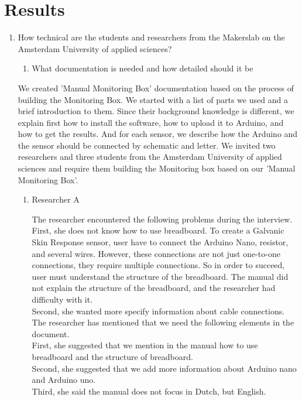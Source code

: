 \documentclass[conference]{IEEEtran}
\begin{document}
\section{Results}
\begin{enumerate}
\item How technical are the students and researchers from the Makerslab on the Amsterdam University of applied sciences?
\begin{enumerate}
\item What documentation is needed and how detailed should it be
\end{enumerate}

 We created 'Manual Monitoring Box' documentation based on the process of building the Monitoring Box. We started with a list of parts we used and a brief introduction to them. Since their background knowledge is different, we explain first how to install the software, how to upload it to Arduino, and how to get the results. And for each sensor, we describe how the Arduino and the sensor should be connected by schematic and letter. We invited two researchers and three students from the Amsterdam University of applied sciences and require them building the Monitoring box based on our 'Manual Monitoring Box'. \\
\begin{enumerate}
\item Researcher A

The researcher encountered the following problems during the interview.\\

		First, she does not know how to use breadboard. To create a Galvanic Skin Response sensor, user have to connect the Arduino Nano, resistor, and several wires. However, these connections are not just one-to-one connections, they require multiple connections. So in order to succeed, user must understand the structure of the breadboard. The manual did not explain the structure of the breadboard, and the researcher had difficulty with it.\\
		Second, she wanted more specify information about cable connections.\\
		 		
The researcher has mentioned that we need the following elements in the document.\\

		First, she suggested that we mention in the manual how to use breadboard and the structure of breadboard. \\
		Second, she suggested that we add more information about Arduino nano and Arduino uno.\\
		Third, she said the manual does not focus in Dutch, but English. \\
		

\end{enumerate}
\end{enumerate}
\end{document}
